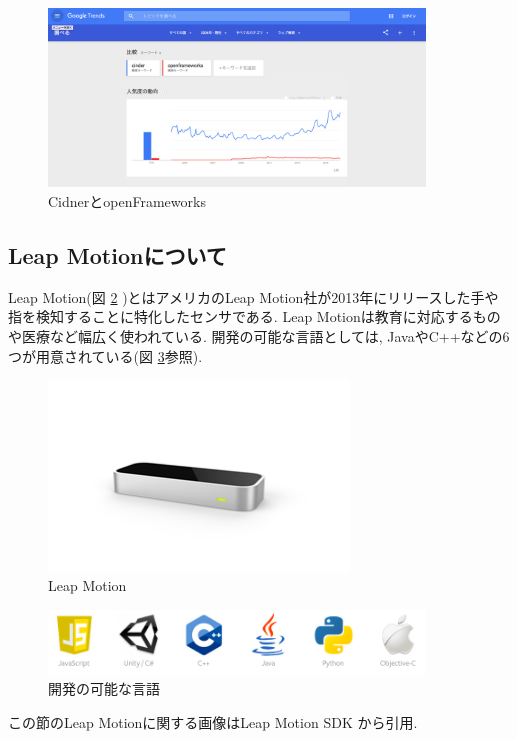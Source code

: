 \documentclass{funthesis}
\begin{document}
\begin{figure}[H]
 \begin{center}
  \includegraphics[width=100mm]{./img/api.png}
 \end{center}
 \caption{CidnerとopenFrameworks}
 \label{API}
\end{figure}


\subsection{Leap Motionについて}
Leap Motion(図 \ref{LeapMotion} )とはアメリカのLeap Motion社が2013年にリリースした手や指を検知することに特化したセンサである. Leap Motionは教育に対応するものや医療など幅広く使われている. 開発の可能な言語としては, JavaやC++などの6つが用意されている(図 \ref{Leapdoc}参照).



\begin{figure}[H]
 \begin{center}
  \includegraphics[width=80mm]{./img/LeapMotion.png}
 \end{center}
 \caption{Leap Motion}
 \label{LeapMotion}
\end{figure}

\begin{figure}[H]
 \begin{center}
  \includegraphics[width=100mm]{./img/Leapdoc.png}
 \end{center}
 \caption{開発の可能な言語}
 \label{Leapdoc}
\end{figure}
この節のLeap Motionに関する画像はLeap Motion SDK から引用.
\end{document}
